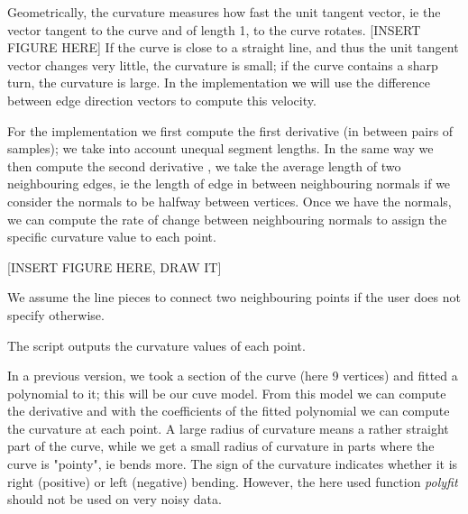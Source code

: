 
Geometrically, the curvature measures how fast the unit tangent vector, ie the vector tangent to the curve and of length 1,  to the curve rotates. 
[INSERT FIGURE HERE]
If the curve is close to a straight line, and thus the unit tangent vector changes very little, the curvature is small; if the curve contains a sharp turn, the curvature is large.
In the implementation we will use the difference between edge direction vectors to compute this velocity.




For the implementation we first compute the first derivative (in between pairs of samples); we take into account unequal segment lengths. In the same way we then compute the second derivative , we take the average length of two neighbouring edges, ie the length of edge in between neighbouring normals if we consider the normals to be halfway between vertices.
Once we have the normals, we can compute the rate of change between neighbouring normals to assign the specific curvature value to each point.

[INSERT FIGURE HERE, DRAW IT]


We assume the line pieces to connect two neighbouring points if the user does not specify otherwise. 

The script outputs the curvature values of each point. 




In a previous version, we  took a section of the curve (here 9 vertices) and fitted a polynomial to it; this will be our cuve model. From this model we can compute the derivative and with the coefficients of the fitted polynomial we can compute the curvature at each point. 
A large radius of curvature means a rather straight part of the curve, while we get a small radius of curvature in parts where the curve is "pointy", ie bends more. The sign of the curvature indicates whether it is right (positive) or left (negative) bending. However, the here used function \textit{polyfit} should not be used on very noisy data.



